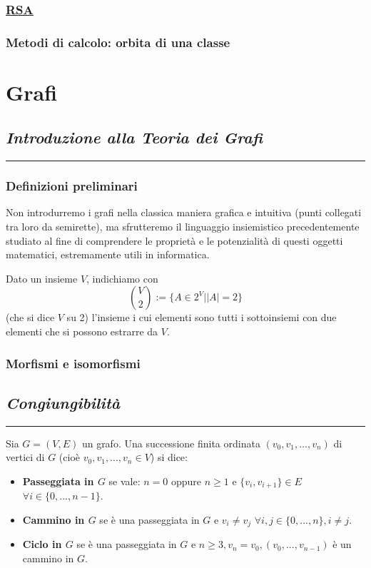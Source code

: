 \documentclass[oneside]{book}
\newcommand{\chptr}[1]{\chapter{\textit{#1}}\noindent\rule{\textwidth}{1pt}}
\theoremstyle{remark}
\begin{document}
\section{\underline{RSA}}
\section{Metodi di calcolo: orbita di una classe}



\part{Grafi}

\chptr{Introduzione alla Teoria dei Grafi}

\section{Definizioni preliminari}
Non introdurremo i grafi nella classica maniera grafica e intuitiva
(punti collegati tra loro da semirette), ma sfrutteremo il linguaggio
insiemistico precedentemente studiato al fine di comprendere le proprietà
e le potenzialità di questi oggetti matematici, estremamente utili in
informatica.

\begin{tcolorbox}[colback=yellow!30, colframe=yellow!30!black, title=Insieme dei 2-sottoinsiemi]
Dato un insieme $V$, indichiamo con
\[ \binom{V}{2}:=\{ A \in 2^V| \left|A\right|=2 \} \]
(che si dice $V$ su 2) l'insieme i cui elementi sono tutti
i sottoinsiemi con due elementi che si possono estrarre da $V$.
\end{tcolorbox}



\section{Morfismi e isomorfismi}



\chptr{Congiungibilità}
\begin{tcolorbox}[colback=yellow!30, colframe=yellow!30!black, title={Passeggiate, cammini, cicli}]
Sia $G=(V,E)$ un grafo. Una successione finita ordinata $(v_0,v_1,...,v_n)$
di vertici di $G$ (cioè $v_0,v_1,...,v_n \in V$) si dice:
\begin{itemize}
\item \textbf{Passeggiata in $G$} se vale: $n=0$ oppure $n\geq 1$ e $\{v_i,v_{i+1}\}\in E$ $\forall i \in \{0,...,n-1\}$.
\item \textbf{Cammino in $G$} se è una passeggiata in $G$ e $v_i \not = v_j$ $\forall i,j \in \{0,...,n\}, i\not = j$.
\item \textbf{Ciclo in $G$} se è una passeggiata in $G$ e $n \geq 3, v_n=v_0, (v_0,...,v_{n-1})$ è un cammino in $G$.
\end{itemize}
\end{tcolorbox}
\end{document}
